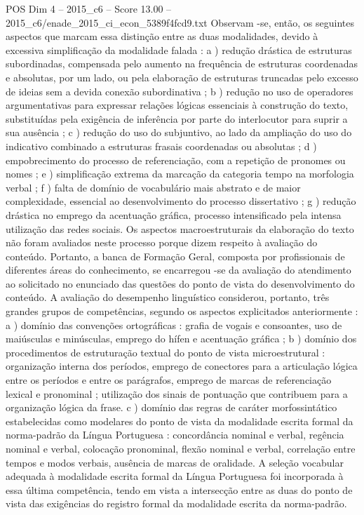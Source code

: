 \begin{textsample}{POS Dim 4 – 2015\_c6 – Score 13.00 – 2015\_c6/enade\_2015\_ci\_econ\_5389f4fcd9.txt}
Observam -se, então, os seguintes aspectos que marcam essa distinção entre as duas modalidades, devido à excessiva simplificação da modalidade falada : a ) redução drástica de estruturas subordinadas, compensada pelo aumento na frequência de estruturas coordenadas e absolutas, por um lado, ou pela elaboração de estruturas truncadas pelo excesso de ideias sem a devida conexão subordinativa ; b ) redução no uso de operadores argumentativas para expressar relações lógicas essenciais à construção do texto, substituídas pela exigência de inferência por parte do interlocutor para suprir a sua ausência ; c ) redução do uso do subjuntivo, ao lado da ampliação do uso do indicativo combinado a estruturas frasais coordenadas ou absolutas ; d ) empobrecimento do processo de referenciação, com a repetição de pronomes ou nomes ; e ) simplificação extrema da marcação da categoria tempo na morfologia verbal ; f ) falta de domínio de vocabulário mais abstrato e de maior complexidade, essencial ao desenvolvimento do processo dissertativo ; g ) redução drástica no emprego da acentuação gráfica, processo intensificado pela intensa utilização das redes sociais.
Os aspectos macroestruturais da elaboração do texto não foram avaliados neste processo porque dizem respeito à avaliação do conteúdo.
Portanto, a banca de Formação Geral, composta por profissionais de diferentes áreas do conhecimento, se encarregou -se da avaliação do atendimento ao solicitado no enunciado das questões do ponto de vista do desenvolvimento do conteúdo.
A avaliação do desempenho linguístico considerou, portanto, três grandes grupos de competências, segundo os aspectos explicitados anteriormente : a ) domínio das convenções ortográficas : grafia de vogais e consoantes, uso de maiúsculas e minúsculas, emprego do hífen e acentuação gráfica ; b ) domínio dos procedimentos de estruturação textual do ponto de vista microestrutural : organização interna dos períodos, emprego de conectores para a articulação lógica entre os períodos e entre os parágrafos, emprego de marcas de referenciação lexical e pronominal ; utilização dos sinais de pontuação que contribuem para a organização lógica da frase. c ) domínio das regras de caráter morfossintático estabelecidas como modelares do ponto de vista da modalidade escrita formal da norma-padrão da Língua Portuguesa : concordância nominal e verbal, regência nominal e verbal, colocação pronominal, flexão nominal e verbal, correlação entre tempos e modos verbais, ausência de marcas de oralidade.
A seleção vocabular adequada à modalidade escrita formal da Língua Portuguesa foi incorporada à essa última competência, tendo em vista a intersecção entre as duas do ponto de vista das exigências do registro formal da modalidade escrita da norma-padrão.

\end{textsample}
